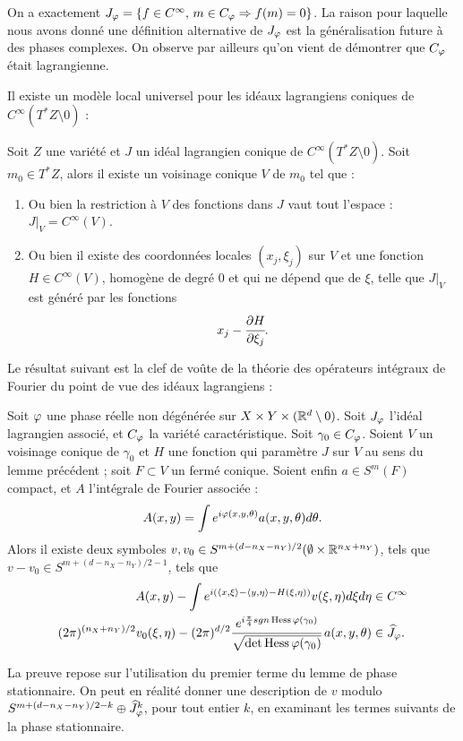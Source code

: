 On a exactement $J_{\varphi}=\{f \in C^{\infty},\, m \in C_{\varphi}\Rightarrow f(m)=0\}$. La raison pour laquelle nous avons donné une définition alternative de $J_{\varphi}$ est la généralisation future à des phases complexes. On observe par ailleurs qu'on vient de démontrer que $C_{\varphi}$ était lagrangienne.

Il existe un modèle local universel pour les idéaux lagrangiens coniques de $C^{\infty}(T^*Z \setminus 0)$ :
\begin{lem}
	Soit $Z$ une variété et $J$ un idéal lagrangien conique de $C^{\infty}(T^*Z \setminus 0)$. Soit $m_0\in T^*Z$, alors il existe un voisinage conique $V$ de $m_0$ tel que :
	\begin{enumerate}
		\item Ou bien la restriction à $V$ des fonctions dans $J$ vaut tout l'espace : $J|_V = C^{\infty}(V)$.
		\item Ou bien il existe des coordonnées locales $(x_j,\xi_j)$ sur $V$ et une fonction $H\in C^{\infty}(V)$, homogène de degré 0 et qui ne dépend que de $\xi$, telle que $J|_{V}$ est généré par les fonctions
		\begin{equation*}
			x_j-\cfrac{\partial H}{\partial \xi_j}.
		\end{equation*}
	\end{enumerate} 
\end{lem}

Le résultat suivant est la clef de voûte de la théorie des opérateurs intégraux de Fourier du point de vue des idéaux lagrangiens :

\begin{theorem}[Hormander]
	Soit $\varphi$ une phase réelle non dégénérée sur $X \times Y \times (\mathbb{R}^d \setminus 0)$. Soit $J_\varphi$ l'idéal lagrangien associé, et $C_{\varphi}$ la variété caractéristique. Soit $\gamma_0\in C_{\varphi}$. Soient $V$ un voisinage conique de $\gamma_0$ et $H$ une fonction qui paramètre $J$ sur $V$ au sens du lemme précédent ; soit $F \subset V$ un fermé conique. Soient enfin $a \in S^m(F)$ compact, et $A$ l'intégrale de Fourier associée :
	\begin{equation*}
		A(x,y)=\int e^{i\varphi(x,y,\theta)}a(x,y,\theta)d\theta.
	\end{equation*}
	Alors il existe deux symboles $v,v_0 \in S^{m + (d-n_X-n_Y)/2}(\emptyset \times \mathbb{R}^{n_X+n_Y})$, tels que $v-v_0 \in S^{m + (d-n_X-n_Y)/2-1}$, tels que 
	\begin{align*}
		A(x,y)-\int e^{i(\langle x,\xi\rangle-\langle y,\eta\rangle - H(\xi,\eta))}v(\xi,\eta)d\xi d\eta &\in C^{\infty}\\
		(2\pi)^{(n_X+n_Y)/2}v_0(\xi,\eta)-(2\pi)^{d/2}\cfrac{e^{i \frac{\pi}{4}sgn\operatorname{Hess} \varphi(\gamma_0)} }{\sqrt{\det\operatorname{Hess} \varphi (\gamma_0)}}\:a(x,y,\theta) &\in \widehat{J}_{\varphi}.
	\end{align*}
\end{theorem}
La preuve repose sur l'utilisation du premier terme du lemme de phase stationnaire. On peut en réalité donner une description de $v$ modulo $S^{m + (d-n_X-n_Y)/2-k}\oplus \widehat{J}_{\varphi}^k$, pour tout entier $k$, en examinant les termes suivants de la phase stationnaire.

